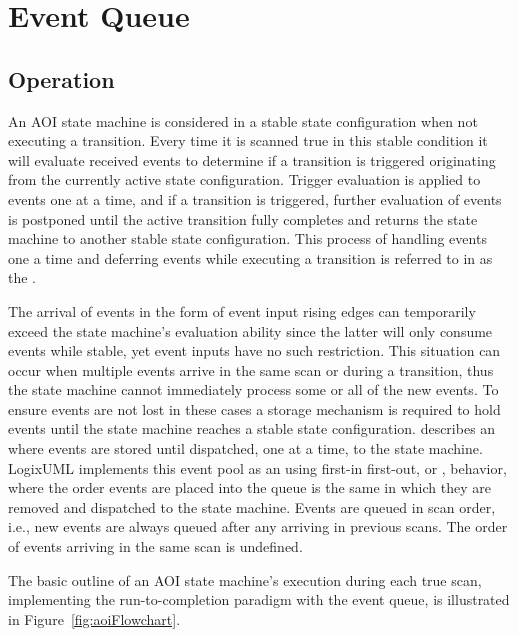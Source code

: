 \section{Event Queue}
\label{sec:eventQueue}


\subsection{Operation}
\label{ss:eventQueueOperation}

An AOI state machine is considered in a stable state configuration when
not executing a transition. Every time it is scanned true in this stable
condition it will evaluate received events to determine
if a transition is triggered
originating from the currently active state configuration. Trigger evaluation
is applied to events one at a time, and if a transition is triggered,
further evaluation of events is postponed until the active transition
fully completes and returns the state machine to another stable state
configuration. This process of handling events one a time and deferring
events while executing a transition is referred to in
\textcite[\S14.2.3.9.1]{OMGUML} as the
.

The arrival of events in the form of event input rising edges can
temporarily exceed the state machine's evaluation ability since the latter
will only consume events while stable, yet event inputs have no such
restriction. This situation can occur when multiple events arrive in the
same scan or during a transition, thus the state machine cannot immediately
process some or all of the new events.
To ensure events are not lost in these cases
a storage mechanism is required to hold events until
the state machine reaches a stable state configuration.
\textcite[\S13.3.3]{OMGUML} describes an
 where events are stored until dispatched,
one at a time, to the state machine. LogixUML implements this event pool
as an  using first-in first-out, or
, behavior, where the order events are
placed into the queue is the same in which they are removed and dispatched
to the state machine. Events are queued in scan order, i.e., new events are
always queued after any arriving in previous scans. The order of
events arriving in the same scan is undefined.

The basic outline of an AOI state machine's execution during each true scan,
implementing the run-to-completion paradigm with the event queue, is
illustrated in Figure~\ref{fig:aoiFlowchart}.


